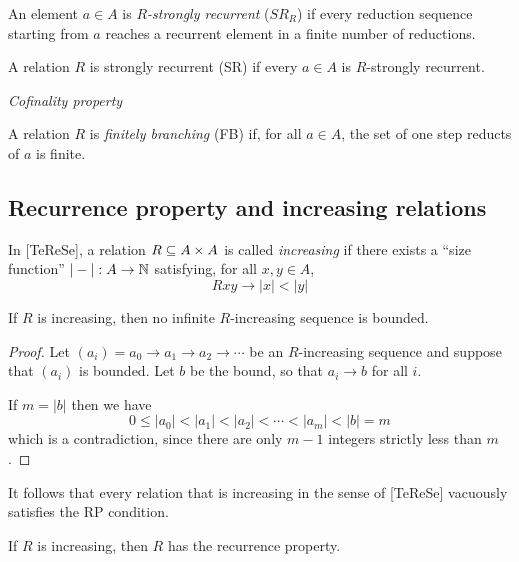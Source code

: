 \documentclass{scrartcl}
\begin{document}
\begin{dfn}
  An element $a \in A$ is \emph{$R$-strongly recurrent} ($SR_R$) if every reduction sequence starting from $a$ reaches a recurrent element in a finite number of reductions.

  A relation $R$ is strongly recurrent (SR) if every
  $a \in A$ is $R$-strongly recurrent.
\end{dfn}







\begin{dfn}
  \emph{Cofinality property}
\end{dfn}

\begin{dfn}
  A relation $R$ is \emph{finitely branching} (FB) if, for all $a \in A$, the set of one step reducts of $a$ is finite.
\end{dfn}

\subsection{Recurrence property and increasing relations}

In [TeReSe], a relation $R \subseteq A \times A$ is called \emph{increasing} if there
exists a ``size function'' $|-| : A \to \mathbb{N}$ satisfying, for all $x, y \in A$,
 \[ Rxy \to |x| < |y| \]

\begin{prop}
  If $R$ is increasing, then no infinite $R$-increasing sequence is bounded.
\end{prop}
\begin{proof}
  Let $(a_i) = a_0 \to a_1 \to a_2 \to \cdots$ be an $R$-increasing sequence
  and suppose that $(a_i)$ is bounded.  Let $b$ be the bound, so that $a_i \to b$ for all $i$.

  If $m = |b|$ then we have
  \[ 0 \le |a_0| < |a_1| < |a_2| < \cdots < |a_m| < |b| = m \]
  which is a contradiction, since there are only $m-1$ integers strictly less than $m$.
\end{proof}

It follows that every relation that is increasing in the sense of [TeReSe]
vacuously satisfies the RP condition.

\begin{cor}
  If $R$ is increasing, then $R$ has the recurrence property.
\end{cor}
\end{document}
